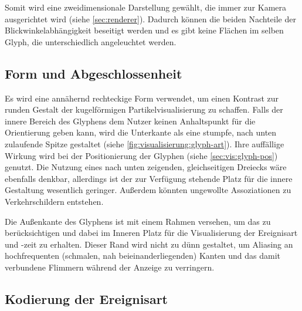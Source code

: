Somit wird eine zweidimensionale Darstellung gewählt, die immer zur Kamera ausgerichtet wird (siehe \autoref{sec:renderer}). Dadurch können die beiden Nachteile der Blickwinkelabhängigkeit beseitigt werden und es gibt keine Flächen im selben Glyph, die unterschiedlich angeleuchtet werden.


\subsection*{Form und Abgeschlossenheit}\label{sec:vis:glyph:form}
Es wird eine annähernd rechteckige Form verwendet, um einen Kontrast zur runden Gestalt der kugelförmigen Partikelvisualisierung zu schaffen. Falls der innere Bereich des Glyphens dem Nutzer keinen Anhaltspunkt für die Orientierung geben kann, wird die Unterkante als eine stumpfe, nach unten zulaufende Spitze gestaltet (siehe \autoref{fig:visualisierung:glyph-art}). Ihre auffällige Wirkung wird bei der Positionierung der Glyphen (siehe \autoref{sec:vis:glyph-pos}) genutzt. Die Nutzung eines nach unten zeigenden, gleichseitigen Dreiecks wäre ebenfalls denkbar, allerdings ist der zur Verfügung stehende Platz für die innere Gestaltung wesentlich geringer. Außerdem könnten ungewollte Assoziationen zu Verkehrschildern entstehen.

Die Außenkante des Glyphens ist mit einem Rahmen versehen, um das  zu berücksichtigen und dabei im Inneren Platz für die Visualisierung der Ereignisart und -zeit zu erhalten. Dieser Rand wird nicht zu dünn gestaltet, um Aliasing an hochfrequenten (schmalen, nah beieinanderliegenden) Kanten und das damit verbundene Flimmern während der Anzeige zu verringern.

\subsection*{Kodierung der Ereignisart}\label{sec:vis:glyph-art}

